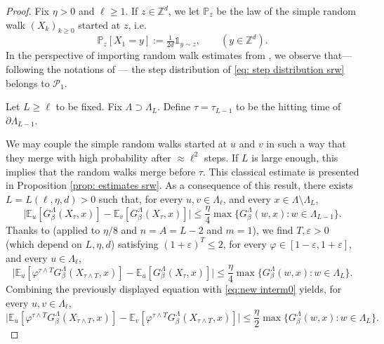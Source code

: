 \documentclass[11pt,a4paper]{article}
\numberwithin{equation}{section}
\theoremstyle{plain}
\theoremstyle{definition}
\begin{document}
\begin{proof} 

Fix $\eta>0$ and $\ell\geq 1$. If $z\in \mathbb Z^d$, we let $\mathbb P_z$ be the law of the simple random walk $(X_k)_{k\geq 0}$ started at $z$, i.e.
\begin{equation}\label{eq: step distribution srw}
\mathbb P_z[X_1=y]:=\tfrac1{2d}\mathds{1}_{y\sim z}, \qquad (y\in \mathbb Z^d).
\end{equation}
In the perspective of importing random walk estimates from \cite{DumPan24Perco}, we observe that--- following the notations of \cite[Appendix~A.2]{DumPan24Perco}--- the step distribution of \eqref{eq: step distribution srw} belongs to $\mathcal P_1$.

Let $L\geq \ell$ to be fixed. Fix $\Lambda\supset \Lambda_L$. Define $\tau=\tau_{L-1}$ to be the hitting time of $\partial\Lambda_{L-1}$.

We may couple the simple random walks started at $u$ and $v$ in such a way that they merge with high probability after $\approx \ell^2$ steps. If $L$ is large enough, this implies that the random walks merge before $\tau$. This classical estimate is presented in Proposition \ref{prop: estimates srw}. As a consequence of this result, there exists $L=L(\ell,\eta,d)>0$ such that, for every $u,v\in \Lambda_\ell$, and every $x\in \Lambda\setminus\Lambda_L$,
\begin{equation}\label{eq:new interm0}
	\Big|\mathbb E_u[G_\beta^{\Lambda}(X_\tau,x)]-\mathbb E_v[G_\beta^{\Lambda}(X_\tau,x)]\Big|\leq \frac{\eta}{4}\max\{G_\beta^{\Lambda}(w,x): w\in \Lambda_{L-1}\}.
\end{equation}
 Thanks to \cite[Corollary~A.6]{DumPan24Perco} (applied to $\eta/8$ and $n=A=L-2$ and $m=1$), we find $T,\varepsilon>0$ (which depend on $L,\eta,d$) satisfying $(1+\varepsilon)^T\leq 2$, for every $\varphi\in[1-\varepsilon,1+\varepsilon]$, and every $u\in \Lambda_\ell$,
 \begin{equation}
 	\Big|\mathbb E_u[\varphi^{\tau\wedge T}G_\beta^{\Lambda}(X_{\tau\wedge T},x)]-\mathbb E_u[G_\beta^{\Lambda}(X_\tau,x)]\Big|\leq \frac{\eta}{4}\max\{G_\beta^{\Lambda}(w,x): w\in \Lambda_{L}\}.
 \end{equation}
 Combining the previously displayed equation with \eqref{eq:new interm0} yields, for every $u,v\in \Lambda_\ell$,
\begin{equation}\label{eq:new interm1}
	\Big|\mathbb E_u[\varphi^{\tau\wedge T}G_\beta^{\Lambda}(X_{\tau\wedge T},x)]-\mathbb E_v[\varphi^{\tau\wedge T}G_\beta^{\Lambda}(X_{\tau\wedge T},x)]\Big|\leq \frac{\eta}{2}\max\{G_\beta^{\Lambda}(w,x): w\in \Lambda_{L}\}.
\end{equation}


\end{proof}
\end{document}
